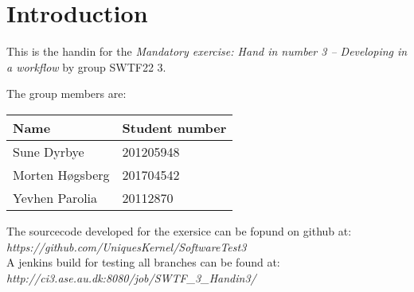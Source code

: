 \section{Introduction}

This is the handin for the \textit{Mandatory exercise: Hand in number 3 – Developing in a workflow} by group SWTF22 3.

The group members are:

\begin{table}
\centering
\begin{tabular}{|l|l|}
\hline
Name & Student number\\
\hline
Sune Dyrbye & 201205948\\
Morten Høgsberg & 201704542 \\
Yevhen Parolia & 20112870\\
\hline
\end{tabular}
\end{table}

The sourcecode developed for the exersice can be fopund on github at:\\ 
\textit{https://github.com/UniquesKernel/SoftwareTest3} \\

A jenkins build for testing all branches can be found at:\\
\textit{http://ci3.ase.au.dk:8080/job/SWTF_3_Handin3/}

\newpage
